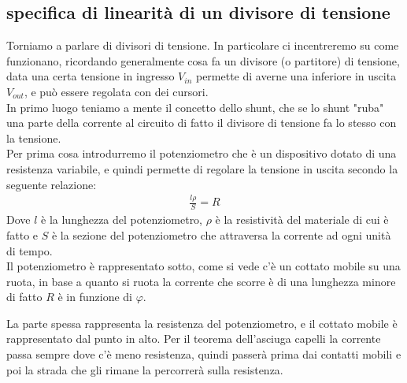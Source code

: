 \documentclass[a4paper, oneside]{article}
\begin{document}
\subsection{specifica di linearità di un divisore di tensione}
Torniamo a parlare di divisori di tensione. In particolare ci incentreremo su come funzionano, ricordando generalmente cosa fa un divisore (o partitore) di tensione, data una certa tensione in ingresso $V_{in}$ 
permette di averne una inferiore in uscita $V_{out}$, e può essere regolata con dei cursori.\\
In primo luogo teniamo a mente il concetto dello shunt, che se lo shunt "ruba" una parte della corrente al circuito di fatto il divisore di tensione fa lo stesso con la tensione.\\
Per prima cosa introdurremo il potenziometro che è un dispositivo dotato di una resistenza variabile, e quindi permette di regolare la tensione in uscita secondo la seguente relazione:
\begin{gather*}
    \frac{l \rho}{S} = R
\end{gather*}
Dove $l$ è la lunghezza del potenziometro, $\rho$ è la resistività del materiale di cui è fatto e $S$ è la sezione del potenziometro che attraversa la corrente ad ogni unità di tempo.\\
Il potenziometro è rappresentato sotto, come si vede c'è un cottato mobile su una ruota, in base a quanto si ruota la corrente che scorre è di una lunghezza minore di fatto $R$ è in funzione di $\varphi$.
\begin{center}
\end{center}
La parte spessa rappresenta la resistenza del potenziometro, e il cottato mobile è rappresentato dal punto in alto. Per il teorema dell'asciuga capelli la corrente passa sempre dove c'è meno resistenza, quindi passerà prima dai contatti mobili e poi la strada che gli rimane la percorrerà sulla resistenza.\\
\end{document}
